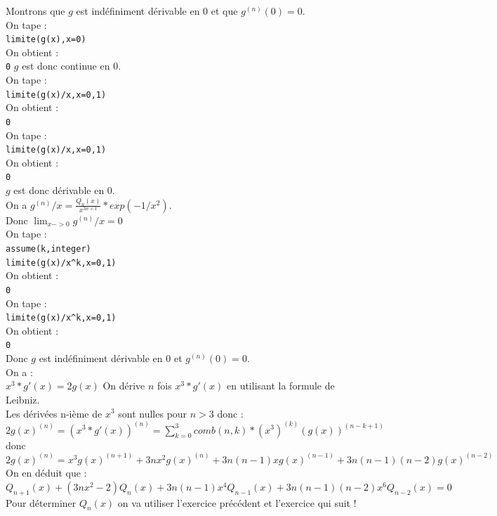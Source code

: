 \documentclass[a4paper,11pt]{book}
\begin{document}
Montrons que $g$ est ind\'efiniment d\'erivable en 0 et que $g^{(n)}(0)=0$.\\
On tape :\\
{\tt limite(g(x),x=0)}\\
On obtient :\\
{\tt 0}
$g$ est donc continue en 0.\\
On tape :\\
{\tt limite(g(x)/x,x=0,1)}\\
On obtient :\\
{\tt 0}\\
On tape :\\
{\tt limite(g(x)/x,x=0,1)}\\
On obtient :\\
{\tt 0}\\
$g$ est donc d\'erivable en 0.\\
On a $g^{(n)}/x=\frac{Q_n(x)}{x^{3n+1}}*exp(-1/x^2)$.\\
Donc $\lim_{x->0}g^{(n)}/x=0$\\
On tape :\\
{\tt assume(k,integer)}\\
{\tt limite(g(x)/x\verb|^|k,x=0,1)}\\
On obtient :\\
{\tt 0}\\
On tape :\\
{\tt limite(g(x)/x\verb|^|k,x=0,1)}\\
On obtient :\\
{\tt 0}\\
Donc $g$ est ind\'efiniment d\'erivable en 0 et $g^{(n)}(0)=0$.\\
On a :\\
$x^3*g'(x)=2g(x)$
On d\'erive $n$ fois $x^3*g'(x)$ en utilisant la formule de Leibniz.\\
Les d\'eriv\'ees n-i\`eme de $x^3$ sont nulles pour $n>3$ donc :\\
$2g(x)^{(n)}=(x^3*g'(x))^{(n)}=\sum_{k=0}^3comb(n,k)*(x^3)^{(k)}(g(x))^{(n-k+1)}$\\
donc\\
$2g(x)^{(n)}=x^3g(x)^{(n+1)}+3nx^2g(x)^{(n)}+3n(n-1)xg(x)^{(n-1)}+3n(n-1)(n-2)g(x)^{(n-2)}$\\
On en d\'eduit que :\\
$Q_{n+1}(x)+(3nx^2-2)Q_{n}(x)+3n(n-1)x^4Q_{n-1}(x)+3n(n-1)(n-2)x^6Q_{n-2}(x)=0$\\
Pour d\'eterminer $Q_n(x)$ on va utiliser l'exercice pr\'ec\'edent et
l'exercice qui suit !
\end{document}
